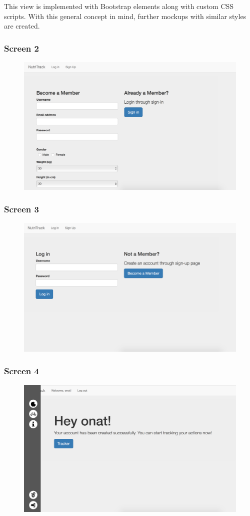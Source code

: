 This view is implemented with Bootstrap elements along with custom CSS
scripts. With this general concept in mind, further mockups with similar styles are created. 

\subsubsection{Screen 2}
\begin{figure}[H]
\centering
\includegraphics[scale=0.38]{3}
\end{figure}


\subsubsection{Screen 3}
\begin{figure}[H]
\centering
\includegraphics[scale=0.38]{4}
\end{figure}

\subsubsection{Screen 4}
\begin{figure}[H]
\centering
\includegraphics[scale=0.38]{5}
\end{figure}
